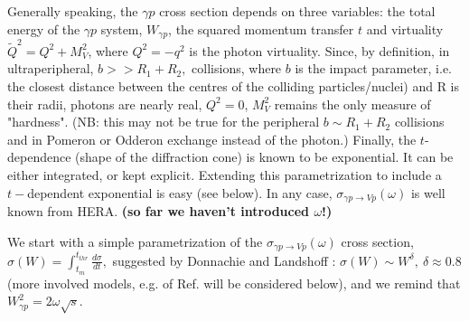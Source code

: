 \documentclass[12pt]{article}
\begin{document}
Generally speaking, the $\gamma p$ cross section depends on three variables: the total energy of the $\gamma p$ system, $W_{\gamma p}$,
the squared momentum transfer $t$ and virtuality $\tilde Q^2=Q^2+M_V^2$, where $Q^2=-q^2$ is the photon virtuality. Since, by definition, in ultraperipheral, $b>>R_1+R_2,$
collisions, where $b$ is the impact parameter, i.e. the closest distance between the centres of the colliding particles/nuclei) and R is their radii,
photons are nearly real, $Q^2=0$, $M_V^2$ remains the only measure of "hardness". (NB: this may not be true for the peripheral $b\sim R_1+R_2$ collisions and in
Pomeron or Odderon exchange instead of the photon.) Finally, the $t$-dependence (shape of the diffraction cone) is known to be exponential. It can be either integrated, or 
kept explicit. Extending this parametrization to include a $t-$dependent exponential is easy (see below). In any case, $\sigma_{\gamma p\rightarrow Vp}(\omega)$ is well known from HERA.
{\bf(so far we haven't introduced $\omega$!)}

We start with a simple parametrization of the $\sigma_{\gamma p\rightarrow Vp}(\omega)$ cross section, $\sigma(W)=\int_{t_m}^{t_{thr}}\frac{d\sigma}{dt},$
suggested by Donnachie and Landshoff \cite{DL}: $\sigma(W)\sim W^{\delta},\ \delta\approx 0.8$ (more involved models, e.g. of Ref. \cite{Capua, Fazio}
will be considered below), and we remind that $W_{\gamma p}^2=2\omega\sqrt {s}$.
\end{document}
